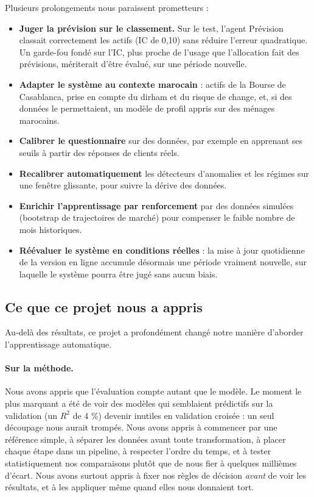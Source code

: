 Plusieurs prolongements nous paraissent prometteurs :
\begin{itemize}
  \item \textbf{Juger la prévision sur le classement.} Sur le test, l'agent Prévision classait correctement les actifs (IC de 0,10) sans réduire l'erreur quadratique. Un garde-fou fondé sur l'IC, plus proche de l'usage que l'allocation fait des prévisions, mériterait d'être évalué, sur une période nouvelle.
  \item \textbf{Adapter le système au contexte marocain} : actifs de la Bourse de Casablanca, prise en compte du dirham et du risque de change, et, si des données le permettaient, un modèle de profil appris sur des ménages marocains.
  \item \textbf{Calibrer le questionnaire} sur des données, par exemple en apprenant ses seuils à partir des réponses de clients réels.
  \item \textbf{Recalibrer automatiquement} les détecteurs d'anomalies et les régimes sur une fenêtre glissante, pour suivre la dérive des données.
  \item \textbf{Enrichir l'apprentissage par renforcement} par des données simulées (bootstrap de trajectoires de marché) pour compenser le faible nombre de mois historiques.
  \item \textbf{Réévaluer le système en conditions réelles} : la mise à jour quotidienne de la version en ligne accumule désormais une période vraiment nouvelle, sur laquelle le système pourra être jugé sans aucun biais.
\end{itemize}

\subsection{Ce que ce projet nous a appris}

Au-delà des résultats, ce projet a profondément changé notre manière d'aborder l'apprentissage automatique.

\paragraph{Sur la méthode.} Nous avons appris que l'évaluation compte autant que le modèle. Le moment le plus marquant a été de voir des modèles qui semblaient prédictifs sur la validation (un $R^2$ de 4 \%) devenir inutiles en validation croisée : un seul découpage nous aurait trompés. Nous avons appris à commencer par une référence simple, à séparer les données avant toute transformation, à placer chaque étape dans un pipeline, à respecter l'ordre du temps, et à tester statistiquement nos comparaisons plutôt que de nous fier à quelques millièmes d'écart. Nous avons surtout appris à fixer nos règles de décision \emph{avant} de voir les résultats, et à les appliquer même quand elles nous donnaient tort.

